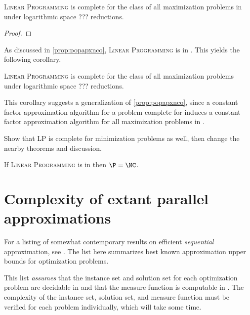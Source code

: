 \documentclass[]{article}
\begin{document}
\begin{theorem}
  \textsc{Linear Programming} is complete for the class of all maximization problems in \PO{} under logarithmic space ??? reductions.
\end{theorem}
\begin{proof}
\end{proof}

As discussed in \autoref{prop:popapxnco}, \textsc{Linear Programming} is in \POp.
This yields the following corollary.

\begin{corollary}
  \textsc{Linear Programming} is complete for the class of all maximization problems \POp{} under logarithmic space ??? reductions.
\end{corollary}

This corollary suggests a generalization of \autoref{prop:popapxnco}, since a constant factor \NC{} approximation algorithm for a problem complete for \POp{} induces a constant factor \NC{} approximation algorithm for all maximization problems in \POp.

\begin{todo}
  Show that LP is complete for minimization problems as well, then change the nearby theorems and discussion.
\end{todo}

\begin{corollary}
  If \textsc{Linear Programming} is in \ApxNCO{} then $\P = \NC$.
\end{corollary}

\section{Complexity of extant parallel approximations}

For a listing of somewhat contemporary results on efficient \emph{sequential} approximation, see \cite{compendium}.
The list here summarizes best known approximation upper bounds for optimization problems.
\begin{todo}
  This list \emph{assumes} that the instance set and solution set for each optimization problem are decidable in \NC{} and that the measure function is computable in \FNC{}.
  The complexity of the instance set, solution set, and measure function must be verified for each problem individually, which will take some time.
\end{todo}
\end{document}
